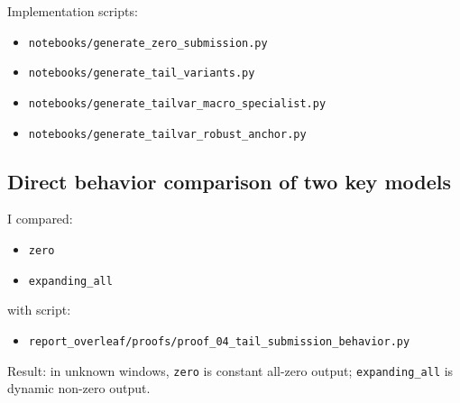Implementation scripts:
\begin{itemize}[leftmargin=1.5em]
  \item \texttt{notebooks/generate\_zero\_submission.py}
  \item \texttt{notebooks/generate\_tail\_variants.py}
  \item \texttt{notebooks/generate\_tailvar\_macro\_specialist.py}
  \item \texttt{notebooks/generate\_tailvar\_robust\_anchor.py}
\end{itemize}

\subsection{Direct behavior comparison of two key models}
I compared:
\begin{itemize}[leftmargin=1.5em]
  \item \texttt{zero}
  \item \texttt{expanding\_all}
\end{itemize}
with script:
\begin{itemize}[leftmargin=1.5em]
  \item \texttt{report\_overleaf/proofs/proof\_04\_tail\_submission\_behavior.py}
\end{itemize}

Result: in unknown windows, \texttt{zero} is constant all-zero output; \texttt{expanding\_all} is dynamic non-zero output.
